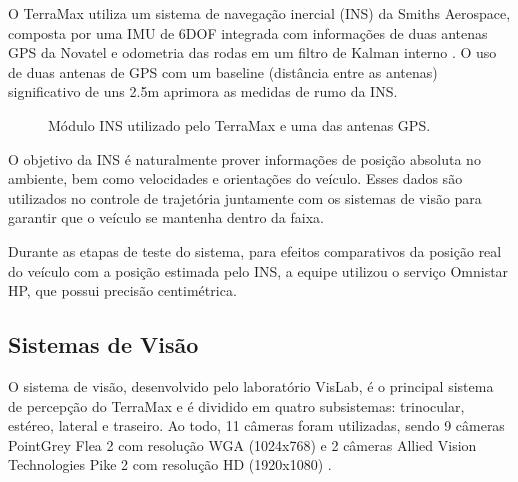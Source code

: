 O TerraMax utiliza um sistema de navegação inercial (INS) da Smiths Aerospace, composta por uma IMU de 6DOF integrada com informações de duas antenas GPS da Novatel e odometria das rodas em um filtro de Kalman interno . O uso de duas antenas de GPS com um baseline (distância entre as antenas) significativo de uns 2.5m aprimora as medidas de rumo da INS.

\begin{figure}[h]
\centering
{}\qquad
{}
\caption{Módulo INS utilizado pelo TerraMax e uma das antenas GPS.}%
\label{fig:INS}%
\end{figure}

O objetivo da INS é naturalmente prover informações de posição absoluta no ambiente, bem como velocidades e orientações do veículo. Esses dados são utilizados no controle de trajetória juntamente com os sistemas de visão para garantir que o veículo se mantenha dentro da faixa.

Durante as etapas de teste do sistema, para efeitos comparativos da posição real do veículo com a posição estimada pelo INS, a equipe utilizou o serviço Omnistar HP, que possui precisão centimétrica.

\subsection{Sistemas de Visão}

O sistema de visão, desenvolvido pelo laboratório VisLab, é o principal sistema de percepção do TerraMax e é dividido em quatro subsistemas: trinocular, estéreo, lateral e traseiro. Ao todo, 11 câmeras foram utilizadas, sendo 9 câmeras PointGrey Flea 2 com resolução WGA (1024x768) e 2 câmeras Allied Vision Technologies Pike 2 com resolução HD (1920x1080) .

